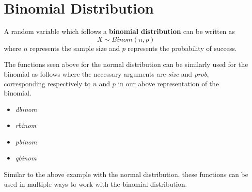 \documentclass{report}\usepackage[]{graphicx}\usepackage[]{color}
\begin{document}
\section{Binomial Distribution}
A random variable which follows a \textbf{binomial distribution} can be written as
\[ X \sim Binom(n,p) \]
where $n$ represents the sample size and $p$ represents the probability of success.  

The functions seen above for the normal distribution can be similarly used for the binomial as follows where the necessary arguments are \textit{size} and \textit{prob}, corresponding respectively to $n$ and $p$ in our above representation of the binomial.
\begin{itemize} 
\item \textit{dbinom}
\item \textit{rbinom}
\item \textit{pbinom}
\item \textit{qbinom}
\end{itemize}

Similar to the above example with the normal distribution, these functions can be used in multiple ways to work with the binomial distribution.  
\end{document}
